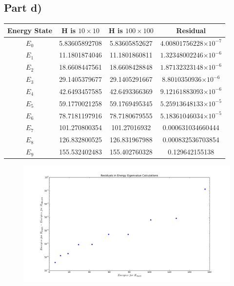 \documentclass[a4paper,12pt]{article}
\providecommand{\e}[1]{\ensuremath{\times 10^{#1}}}
\begin{document}
\subsection{Part d)}

\begin{table}[H]
  \centering
  \begin{tabular}{|c||c||c||c|}
  \hline
  Energy State & H is $10 \times 10$ & H is $100 \times 100$ & Residual\\
  \hline
  \hline
   $E_0$ & 5.83605892708 & 5.83605852627 & $4.00801756228\e{-7}$\\
	\hline
	 $E_1$ & 11.1801874046 & 11.1801860811 & $1.32348002246\e{-6}$\\
	\hline
	 $E_2$ & 18.6608447561 & 18.6608428848 & $1.87132323148\e{-6}$\\
	\hline
	 $E_3$ & 29.1405379677 & 29.1405291667 & $8.8010350936\e{-6}$\\
	\hline
	 $E_4$ & 42.6493457585 & 42.6493366369 & $9.12161883093\e{-6}$\\
	\hline
	 $E_5$ & 59.1770021258 & 59.1769495345 & $5.25913648133\e{-5}$\\
	\hline
	 $E_6$ & 78.7181197916 & 78.7180679555 & $5.18361046034\e{-5}$\\
	\hline
	 $E_7$ & 101.270800354 & 101.27016932 & 0.000631034660444\\
	\hline
	 $E_8$ & 126.832800525 & 126.831967988 & 0.000832536703854\\
	\hline
	 $E_9$ & 155.532402483 & 155.402760328 & 0.129642155138\\
	\hline
  \end{tabular}
\label{tab:energy}
\end{table}

\begin{figure}[H]
\centering
\includegraphics[width = \linewidth]{lab4q2d.png}
\caption{}
\label{fig:q2d}
\end{figure}
\end{document}
